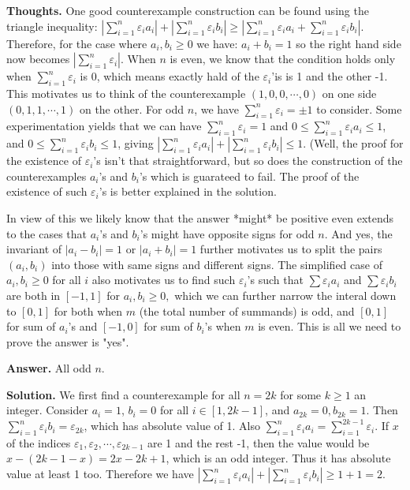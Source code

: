 \documentclass[11pt,a4paper]{article}
\begin{document}
\begin{itemize}
\textbf{Thoughts.} 
One good counterexample construction can be found using the triangle inequality: 
$ \left| \sum_{i=1}^n \varepsilon_i a_i \right| + \left| \sum_{i=1}^n \varepsilon_i b_i \right|\ge  \left| \sum_{i=1}^n \varepsilon_i a_i + \sum_{i=1}^n \varepsilon_i b_i \right|$. 
Therefore, for the case where $a_i, b_i\ge 0$ we have: 
$a_i+b_i=1$ 
so the right hand side now becomes $\left| \sum_{i=1}^n \varepsilon_i \right|$. 
When $n$ is even, we know that the condition holds only when $\sum_{i=1}^n \varepsilon_i$ is 0, which means exactly hald of the $\varepsilon_i$'is is 1 and the other -1. 
This motivates us to think of the counterexample $(1, 0, 0, \cdots , 0)$ on one side $(0, 1, 1, \cdots, 1)$ on the other. 
For odd $n$, we have $\sum_{i=1}^n \varepsilon_i=\pm 1$ to consider. 
Some experimentation yields that we can have $\sum_{i=1}^n \varepsilon_i= 1$ and 
$0\le \sum_{i=1}^n \varepsilon_i a_i\le 1$, and 
$0\le \sum_{i=1}^n \varepsilon_i b_i\le 1$, giving 
$| \sum_{i=1}^n \varepsilon_i a_i|+|\sum_{i=1}^n \varepsilon_i b_i|\le 1$. 
(Well, the proof for the existence of $\varepsilon_i$'s isn't that straightforward, but so does the construction of the counterexamples $a_i$'s and $b_i$'s which is guarateed to fail. The proof of the existence of such $\varepsilon_i$'s is better explained in the solution. 

In view of this we likely know that the answer *might* be positive even extends to the cases that $a_i$'s and $b_i$'s might have opposite signs for odd $n$. And yes, the invariant of $|a_i-b_i|=1$ or $|a_i+b_i|=1$ further motivates us to split the pairs $(a_i, b_i)$ into those with same signs and different signs. The simplified case of $a_i, b_i\ge 0$ for all $i$ also motivates us to find such $\varepsilon_i$'s such that $\sum\varepsilon_i a_i$ and $\sum\varepsilon_i b_i$ are both in $[-1, 1]$ for $a_i, b_i\ge 0, $ which we can further narrow the interal down to $[0, 1]$ for both when $m$ (the total number of summands) is odd, and $[0, 1]$ for sum of $a_i$'s and $[-1, 0]$ for sum of $b_i$'s when $m$ is even. This is all we need to prove the answer is "yes". 

\textbf{Answer.} All odd $n$. 

\textbf{Solution.} 
We first find a counterexample for all $n=2k$ for some $k\ge 1$ an integer. 
Consider $a_i=1$, $b_i=0$ for all $i\in [1, 2k-1]$, 
and $a_{2k}=0, b_{2k}=1$. 
Then $\sum_{i=1}^n \varepsilon_i b_i=\varepsilon_{2k}$, which has absolute value of 1. 
Also $\sum_{i=1}^n \varepsilon_i a_i=\sum_{i=1}^{2k-1} \varepsilon_i$. 
If $x$ of the indices $\varepsilon_1, \varepsilon_2, \cdots , \varepsilon_{2k-1}$ are 1 and the rest -1, 
then the value would be $x-(2k-1-x)=2x-2k+1$, which is an odd integer. Thus it has absolute value at least 1 too. 
Therefore we have 
$\left| \sum_{i=1}^n \varepsilon_i a_i \right| + \left| \sum_{i=1}^n \varepsilon_i b_i \right|\ge 1+1=2$. 


\end{itemize}
\end{document}
